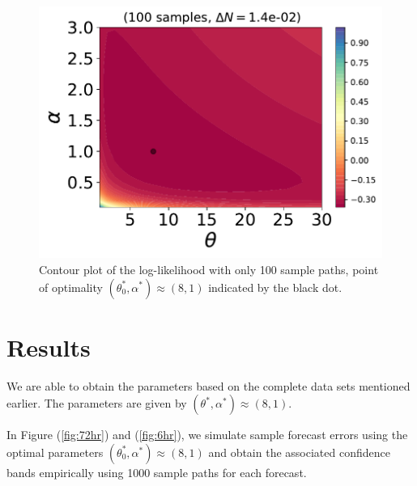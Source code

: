 \documentclass[ima, 20pt, portrait, plainboxedsections]{sciposter}
\begin{document}
\begin{multicols}{3}
 \begin{figure}[t]
\begin{center}
   \includegraphics[width=0.9\linewidth]{ISO_100_samples_dN=14e-02.pdf}
\end{center}
   \caption{Contour plot of the log-likelihood with only 100 sample paths, point of optimality $(\theta_0^*, \alpha^*)\approx (8,1)$ indicated by the  black dot.}
\label{contour}
\end{figure} 


\section*{Results}
 We are able to obtain the parameters based on the complete data sets mentioned earlier. The parameters are given by $(\theta^*, \alpha^*)\approx (8,1)$.
 
 
 
In Figure (\ref{fig:72hr}) and (\ref{fig:6hr}), we simulate sample forecast errors using the optimal parameters  $(\theta_0^*, \alpha^*)\approx (8,1)$ and obtain the associated confidence bands empirically using 1000 sample paths for each forecast. %


\end{multicols}
\end{document}
